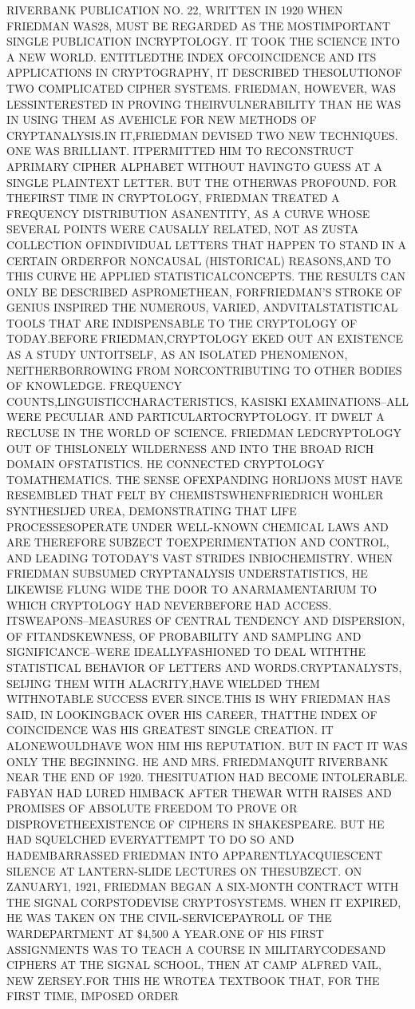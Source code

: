 \documentclass[a4paper,12pt]{article}
\begin{document}
RIVERBANK PUBLICATION NO. 22, WRITTEN IN 1920 WHEN FRIEDMAN WAS28, MUST BE REGARDED AS THE MOSTIMPORTANT SINGLE PUBLICATION INCRYPTOLOGY. IT TOOK THE SCIENCE INTO A NEW WORLD. ENTITLEDTHE INDEX OFCOINCIDENCE AND ITS APPLICATIONS IN CRYPTOGRAPHY, IT DESCRIBED THESOLUTIONOF TWO COMPLICATED CIPHER SYSTEMS. FRIEDMAN, HOWEVER, WAS LESSINTERESTED IN PROVING THEIRVULNERABILITY THAN HE WAS IN USING THEM AS AVEHICLE FOR NEW METHODS OF CRYPTANALYSIS.IN IT,FRIEDMAN DEVISED TWO NEW TECHNIQUES. ONE WAS BRILLIANT. ITPERMITTED HIM TO RECONSTRUCT APRIMARY CIPHER ALPHABET WITHOUT HAVINGTO GUESS AT A SINGLE PLAINTEXT LETTER. BUT THE OTHERWAS PROFOUND. FOR THEFIRST TIME IN CRYPTOLOGY, FRIEDMAN TREATED A FREQUENCY DISTRIBUTION ASANENTITY, AS A CURVE WHOSE SEVERAL POINTS WERE CAUSALLY RELATED, NOT AS ZUSTA COLLECTION OFINDIVIDUAL LETTERS THAT HAPPEN TO STAND IN A CERTAIN ORDERFOR NONCAUSAL (HISTORICAL) REASONS,AND TO THIS CURVE HE APPLIED STATISTICALCONCEPTS. THE RESULTS CAN ONLY BE DESCRIBED ASPROMETHEAN, FORFRIEDMAN'S STROKE OF GENIUS INSPIRED THE NUMEROUS, VARIED, ANDVITALSTATISTICAL TOOLS THAT ARE INDISPENSABLE TO THE CRYPTOLOGY OF TODAY.BEFORE FRIEDMAN,CRYPTOLOGY EKED OUT AN EXISTENCE AS A STUDY UNTOITSELF, AS AN ISOLATED PHENOMENON, NEITHERBORROWING FROM NORCONTRIBUTING TO OTHER BODIES OF KNOWLEDGE. FREQUENCY COUNTS,LINGUISTICCHARACTERISTICS, KASISKI EXAMINATIONS--ALL WERE PECULIAR AND PARTICULARTOCRYPTOLOGY. IT DWELT A RECLUSE IN THE WORLD OF SCIENCE. FRIEDMAN LEDCRYPTOLOGY OUT OF THISLONELY WILDERNESS AND INTO THE BROAD RICH DOMAIN OFSTATISTICS. HE CONNECTED CRYPTOLOGY TOMATHEMATICS. THE SENSE OFEXPANDING HORIJONS MUST HAVE RESEMBLED THAT FELT BY CHEMISTSWHENFRIEDRICH WOHLER SYNTHESIJED UREA, DEMONSTRATING THAT LIFE PROCESSESOPERATE UNDER WELL-KNOWN CHEMICAL LAWS AND ARE THEREFORE SUBZECT TOEXPERIMENTATION AND CONTROL, AND LEADING TOTODAY'S VAST STRIDES INBIOCHEMISTRY. WHEN FRIEDMAN SUBSUMED CRYPTANALYSIS UNDERSTATISTICS, HE LIKEWISE FLUNG WIDE THE DOOR TO ANARMAMENTARIUM TO WHICH CRYPTOLOGY HAD NEVERBEFORE HAD ACCESS. ITSWEAPONS--MEASURES OF CENTRAL TENDENCY AND DISPERSION, OF FITANDSKEWNESS, OF PROBABILITY AND SAMPLING AND SIGNIFICANCE--WERE IDEALLYFASHIONED TO DEAL WITHTHE STATISTICAL BEHAVIOR OF LETTERS AND WORDS.CRYPTANALYSTS, SEIJING THEM WITH ALACRITY,HAVE WIELDED THEM WITHNOTABLE SUCCESS EVER SINCE.THIS IS WHY FRIEDMAN HAS SAID, IN LOOKINGBACK OVER HIS CAREER, THATTHE INDEX OF COINCIDENCE WAS HIS GREATEST SINGLE CREATION. IT ALONEWOULDHAVE WON HIM HIS REPUTATION. BUT IN FACT IT WAS ONLY THE BEGINNING. HE AND MRS. FRIEDMANQUIT RIVERBANK NEAR THE END OF 1920. THESITUATION HAD BECOME INTOLERABLE. FABYAN HAD LURED HIMBACK AFTER THEWAR WITH RAISES AND PROMISES OF ABSOLUTE FREEDOM TO PROVE OR DISPROVETHEEXISTENCE OF CIPHERS IN SHAKESPEARE. BUT HE HAD SQUELCHED EVERYATTEMPT TO DO SO AND HADEMBARRASSED FRIEDMAN INTO APPARENTLYACQUIESCENT SILENCE AT LANTERN-SLIDE LECTURES ON THESUBZECT. ON ZANUARY1, 1921, FRIEDMAN BEGAN A SIX-MONTH CONTRACT WITH THE SIGNAL CORPSTODEVISE CRYPTOSYSTEMS. WHEN IT EXPIRED, HE WAS TAKEN ON THE CIVIL-SERVICEPAYROLL OF THE WARDEPARTMENT AT \$4,500 A YEAR.ONE OF HIS FIRST ASSIGNMENTS WAS TO TEACH A COURSE IN MILITARYCODESAND CIPHERS AT THE SIGNAL SCHOOL, THEN AT CAMP ALFRED VAIL, NEW ZERSEY.FOR THIS HE WROTEA TEXTBOOK THAT, FOR THE FIRST TIME, IMPOSED ORDER 
\end{document}
